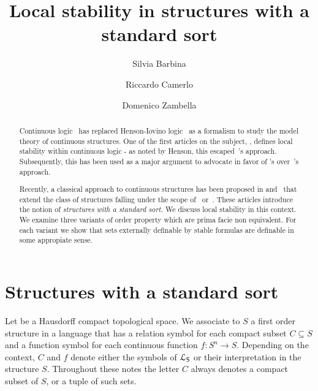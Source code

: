 \documentclass{amsproc}
\author{Silvia Barbina}
\author{Riccardo Camerlo}
\author{Domenico Zambella}
\theoremstyle{mio}
\renewcommand*{\emph}[1]{%
   \smash{\tikz[baseline]\node[rectangle, fill=teal!25, rounded corners, inner xsep=0.5ex, inner ysep=0.2ex, anchor=base, minimum height = 2.7ex]{\strut #1};}}
\begin{document}
\title{Local stability in structures with a standard sort}
\maketitle
\raggedbottom

\begin{abstract}
  Continuous logic~\cite{BBHU} has replaced Henson-Iovino logic~\cite{HI} as a
  formalism to study the model theory of continuous structures.
  One of the first articles on the subject, \cite{BU}, defines local stability within continuous logic - as noted by Henson, this escaped~\cite{HI}'s approach.
  Subsequently, this has been used as a major argument to advocate in favor of \cite{BBHU}'s over~\cite{HI}'s approach.\smallskip

  \noindent
  Recently, a classical approach to continuous structures has been proposed  in \cite{clcl} and~\cite{Z} that extend the class of structures falling under the scope of~\cite{HI} or~\cite{BBHU}.
  These articles introduce the notion of \textit{structures with a standard sort.}
  We discuss local stability in this context.
  We examine three variants of order property which are prima facie non equivalent.
  For each variant we show that sets externally definable by stable formulas are definable in some appropiate sense.
\end{abstract}

\def\medrel#1{\parbox{6ex}{\hfil $#1$}}
\def\ceq#1#2#3{\parbox[t]{13ex}{$\displaystyle #1$}\medrel{#2}{$\displaystyle #3$}}

\section{Structures with a standard sort}

Let \emph{$S$\/} be a Hausdorff compact topological space.
We associate to $S$ a first order structure in a language \emph{${\EuScript L}_{\sf S}$\/} that has a relation symbol for each compact subset $C\subseteq S$ and a function symbol for each continuous function $f:S^n\to S$.
Depending on the context, $C$ and $f$ denote either the symbols of ${\EuScript L}_{\sf S}$ or their interpretation in the structure $S$.
Throughout these notes the letter $C$ always denotes a compact subset of $S$, or a tuple of such sets.
\end{document}
